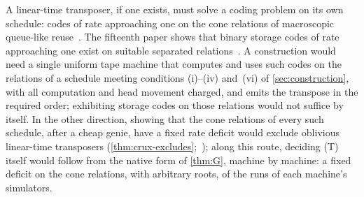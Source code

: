 A linear-time transposer, if one exists, must solve a coding problem on its own schedule: codes of rate approaching one on the cone
relations of macroscopic queue-like reuse~\cite[Corollary~O]{BoundedStack2026}. The fifteenth paper shows that binary storage codes of
rate approaching one exist on suitable separated relations~\cite{HighRate2026}. A construction would need a single uniform tape machine
that computes and uses such codes on the relations of a schedule meeting conditions (i)--(iv) and~(vi) of \cref{sec:construction}, with all
computation and head movement charged, and emits the transpose in the required order; exhibiting storage codes on those relations would
not suffice by itself. In the other direction, showing that the cone relations of
every such schedule, after a cheap genie, have a fixed rate deficit would exclude oblivious linear-time transposers
(\cref{thm:crux-excludes};~\cite[Corollary~O]{BoundedStack2026}); along this route, deciding (T) itself would follow from the native form of \cref{thm:G},
machine by machine: a fixed deficit on the cone relations, with arbitrary roots, of the runs of each machine's simulators.
